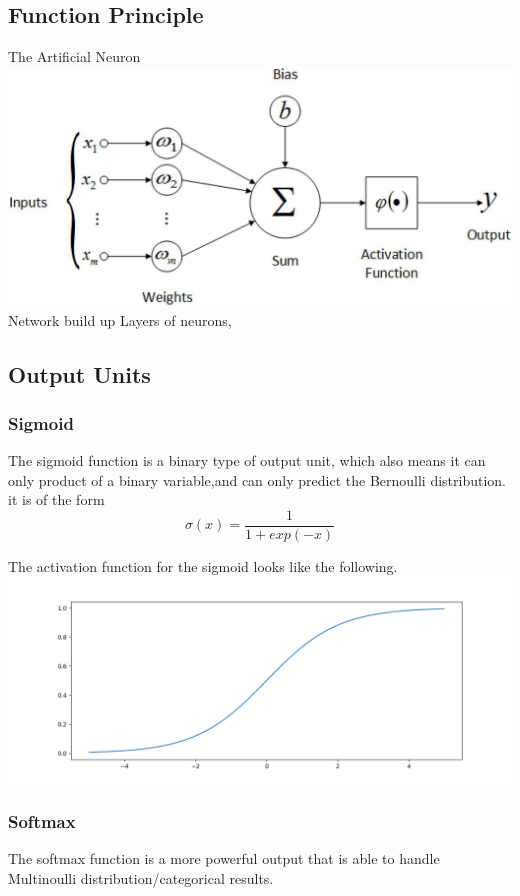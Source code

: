 \documentclass[a4paper,10pt,titlepage]{report}
\begin{document}
\subsection{Function Principle}
The Artificial Neuron\\
\includegraphics[scale=0.1]{neuron.jpeg}
\\


Network build up
Layers of neurons, 
\subsection{Output Units}
\subsubsection{Sigmoid}
The sigmoid function is a binary type of output unit, which also means it can only product of a binary variable,and can only predict the Bernoulli distribution. it is of the form
\begin{equation}
\sigma(x) = \frac{1}{1+exp(-x)}
\end{equation}

The activation function for the sigmoid looks like the following.\\
\includegraphics[scale=0.4]{sigmoid.png}
\subsubsection{Softmax}
The softmax function is a more powerful output that is able to handle Multinoulli distribution/categorical results.
\end{document}
